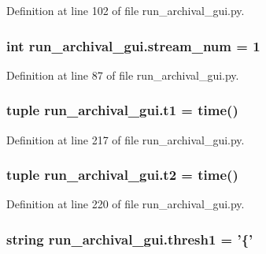 Definition at line 102 of file run\-\_\-archival\-\_\-gui.\-py.

\hypertarget{namespacerun__archival__gui_a62873170b28c127df5a067091c237022}{
\subsubsection[{stream\-\_\-num}]{\setlength{\rightskip}{0pt plus 5cm}int run\-\_\-archival\-\_\-gui.\-stream\-\_\-num = 1}}\label{namespacerun__archival__gui_a62873170b28c127df5a067091c237022}


Definition at line 87 of file run\-\_\-archival\-\_\-gui.\-py.

\hypertarget{namespacerun__archival__gui_af91f95bd327e5d074319142c030b1828}{
\subsubsection[{t1}]{\setlength{\rightskip}{0pt plus 5cm}tuple run\-\_\-archival\-\_\-gui.\-t1 = time()}}\label{namespacerun__archival__gui_af91f95bd327e5d074319142c030b1828}


Definition at line 217 of file run\-\_\-archival\-\_\-gui.\-py.

\hypertarget{namespacerun__archival__gui_a7f38eabe30ed0eff6aec3000df2d83e3}{
\subsubsection[{t2}]{\setlength{\rightskip}{0pt plus 5cm}tuple run\-\_\-archival\-\_\-gui.\-t2 = time()}}\label{namespacerun__archival__gui_a7f38eabe30ed0eff6aec3000df2d83e3}


Definition at line 220 of file run\-\_\-archival\-\_\-gui.\-py.

\hypertarget{namespacerun__archival__gui_ab8a2a553c59d2c9c0bd81a138341bdbd}{
\subsubsection[{thresh1}]{\setlength{\rightskip}{0pt plus 5cm}string run\-\_\-archival\-\_\-gui.\-thresh1 = '\{'}}\label{namespacerun__archival__gui_ab8a2a553c59d2c9c0bd81a138341bdbd}


